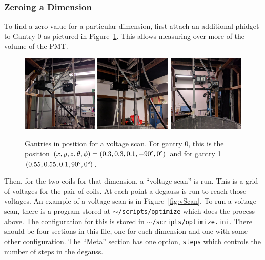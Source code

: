 \documentclass[twoside,letterpaper]{refart}
\begin{document}
\subsubsection{Zeroing a Dimension}

To find a zero value for a particular dimension, first attach an additional phidget to Gantry 0 as pictured in Figure~\ref{fig:gantryPositions}. This allows measuring over more of the volume of the PMT.

\FloatBarrier
\begin{figure}[htb!]\centering
  \includegraphics[width=0.325\textwidth]{images/gantriesBehind.jpg}
  \includegraphics[width=0.325\textwidth]{images/gantriesSide.jpg}
  \includegraphics[width=0.325\textwidth]{images/gantriesFront.jpg}
  \caption{Gantries in position for a voltage scan. For gantry 0, this is the position $(x, y, z, \theta, \phi) = (0.3, 0.3, 0.1, -90\degree, 0\degree)$ and for gantry 1 $(0.55, 0.55, 0.1, 90\degree, 0\degree)$.\label{fig:gantryPositions}}
\end{figure}
\FloatBarrier

Then, for the two coils for that dimension, a ``voltage scan'' is run. This is a grid of voltages for the pair of coils. At each point a degauss is run to reach those voltages. An example of a voltage scan is in Figure~\ref{fig:vScan}. To run a voltage scan, there is a program stored at \texttt{\(\sim\)/scripts/optimize} which does the process above. The configuration for this is stored in \texttt{\(\sim\)/scripts/optimize.ini}. There should be four sections in this file, one for each dimension and one with some other configuration. The ``Meta'' section has one option, \texttt{steps} which controls the number of steps in the degauss.
\end{document}
